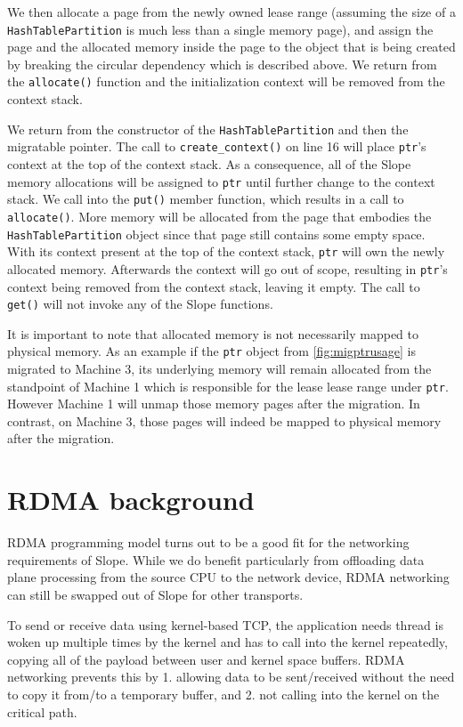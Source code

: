 We then allocate a page from the newly owned lease range (assuming the size of
a \texttt{HashTablePartition} is much less than a single memory page), and assign the
page and the allocated memory inside the page to the object that is being
created by breaking the circular dependency which is described above.
We return from the \texttt{allocate()} function and the initialization context
will be removed from the context stack.

We return from the constructor of the \texttt{HashTablePartition} and then
the migratable pointer. The call to \texttt{create\_context()} on line 16 
will place
\texttt{ptr}'s context at the top of the context stack. As a consequence, all of the
Slope memory allocations will be assigned to \texttt{ptr} until further change
to the context stack. We call into the \texttt{put()} member function, which
results in a call to \texttt{allocate()}. More memory will be allocated from
the page that embodies the \texttt{HashTablePartition} object since that page
still contains some empty space. With its context present at the top of
the context stack,
\texttt{ptr} will own the newly allocated memory. Afterwards the context will
go out of scope, resulting in \texttt{ptr}'s context being removed from the
context stack, leaving it empty.
The call to \texttt{get()} will not invoke any of the Slope functions.

It is important to note that allocated memory is not necessarily mapped to
physical memory. As an example if the \texttt{ptr} object from
\autoref{fig:migptrusage} is migrated to Machine 3, its underlying memory
will remain allocated from the standpoint of Machine 1 which is responsible for
the lease lease range under \texttt{ptr}.
However Machine 1 will unmap those memory pages after the migration.
In contrast, on Machine 3, those pages will indeed be mapped to
physical memory after the migration.

\section{RDMA background}
RDMA programming model turns out to be a good fit for the networking
requirements of Slope. While we do benefit particularly from
offloading data plane processing from the source CPU to the network device,
RDMA networking can still be swapped out of Slope for other transports.

To send or receive data using kernel-based TCP, the application needs thread
is woken up multiple times by the kernel and has to call into the kernel
repeatedly, copying all of the payload between user and kernel space buffers.
RDMA networking prevents this by 1. allowing data to be sent/received without
the need to copy it from/to a temporary buffer, and 2. not calling into the
kernel on the critical path.


